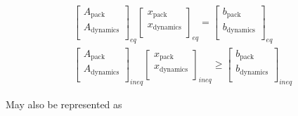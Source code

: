 \documentclass[letterpaper, 10pt, conference]{IEEEtran}
\begin{document}
\begin{equation*}
\begin{array}{c}
    \begin{bmatrix}
	A_{\textrm{pack}}     \\
	A_{\textrm{dynamics}} \\
    \end{bmatrix}_{eq}
    \begin{bmatrix}
	x_{\textrm{pack}}     \\
	x_{\textrm{dynamics}} \\
    \end{bmatrix}_{eq} =
    \begin{bmatrix}
	b_{\textrm{pack}}     \\
	b_{\textrm{dynamics}} \\
    \end{bmatrix}_{eq} \\
    \begin{bmatrix}
	A_{\textrm{pack}}     \\
	A_{\textrm{dynamics}} \\
    \end{bmatrix}_{ineq}
    \begin{bmatrix}
	x_{\textrm{pack}}     \\
	x_{\textrm{dynamics}} \\
    \end{bmatrix}_{ineq} \geq
    \begin{bmatrix}
	b_{\textrm{pack}}     \\
	b_{\textrm{dynamics}} \\
    \end{bmatrix}_{ineq}
\end{array}
\end{equation*}

May also be represented as

\scriptsize
\end{document}
